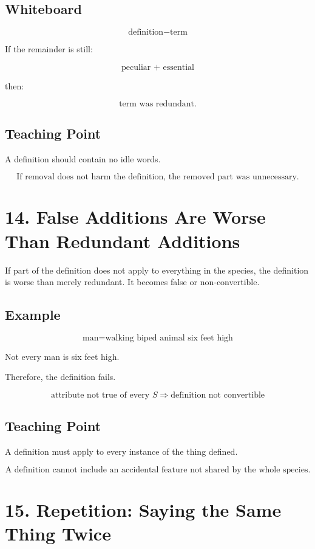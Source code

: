 \documentclass[12pt]{article}
\begin{document}
\subsection*{Whiteboard}

\[
\text{definition} - \text{term}
\]

If the remainder is still:

\[
\text{peculiar + essential}
\]

then:

\[
\text{term was redundant.}
\]

\subsection*{Teaching Point}

A definition should contain no idle words.

\[
\boxed{
\text{If removal does not harm the definition, the removed part was unnecessary.}
}
\]

\section*{14. False Additions Are Worse Than Redundant Additions}

If part of the definition does not apply to everything in the species, the
definition is worse than merely redundant. It becomes false or non-convertible.

\subsection*{Example}

\[
\text{man} = \text{walking biped animal six feet high}
\]

Not every man is six feet high.

Therefore, the definition fails.

\[
\text{attribute not true of every } S
\Rightarrow
\text{definition not convertible}
\]

\subsection*{Teaching Point}

A definition must apply to every instance of the thing defined.

\[
\boxed{
\text{A definition cannot include an accidental feature not shared by the whole species.}
}
\]

\section*{15. Repetition: Saying the Same Thing Twice}
\end{document}
